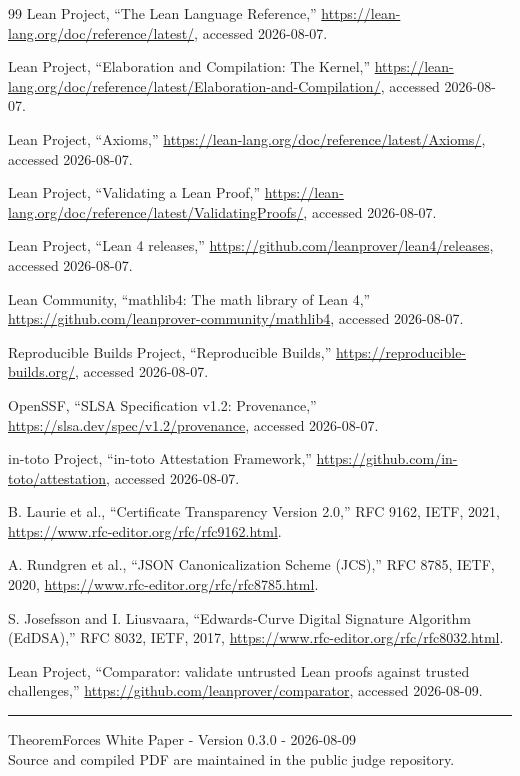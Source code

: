 \documentclass[a4paper,11pt]{ltjsarticle}
\begin{document}
\begin{thebibliography}{99}
Lean Project,
``The Lean Language Reference,''
\url{https://lean-lang.org/doc/reference/latest/}, accessed 2026-08-07.

Lean Project,
``Elaboration and Compilation: The Kernel,''
\url{https://lean-lang.org/doc/reference/latest/Elaboration-and-Compilation/}, accessed 2026-08-07.

Lean Project,
``Axioms,''
\url{https://lean-lang.org/doc/reference/latest/Axioms/}, accessed 2026-08-07.

Lean Project,
``Validating a Lean Proof,''
\url{https://lean-lang.org/doc/reference/latest/ValidatingProofs/}, accessed 2026-08-07.

Lean Project,
``Lean 4 releases,''
\url{https://github.com/leanprover/lean4/releases}, accessed 2026-08-07.

Lean Community,
``mathlib4: The math library of Lean 4,''
\url{https://github.com/leanprover-community/mathlib4}, accessed 2026-08-07.

Reproducible Builds Project,
``Reproducible Builds,''
\url{https://reproducible-builds.org/}, accessed 2026-08-07.

OpenSSF,
``SLSA Specification v1.2: Provenance,''
\url{https://slsa.dev/spec/v1.2/provenance}, accessed 2026-08-07.

in-toto Project,
``in-toto Attestation Framework,''
\url{https://github.com/in-toto/attestation}, accessed 2026-08-07.

B. Laurie et al.,
``Certificate Transparency Version 2.0,'' RFC 9162, IETF, 2021,
\url{https://www.rfc-editor.org/rfc/rfc9162.html}.

A. Rundgren et al.,
``JSON Canonicalization Scheme (JCS),'' RFC 8785, IETF, 2020,
\url{https://www.rfc-editor.org/rfc/rfc8785.html}.

S. Josefsson and I. Liusvaara,
``Edwards-Curve Digital Signature Algorithm (EdDSA),'' RFC 8032, IETF, 2017,
\url{https://www.rfc-editor.org/rfc/rfc8032.html}.

Lean Project,
``Comparator: validate untrusted Lean proofs against trusted challenges,''
\url{https://github.com/leanprover/comparator}, accessed 2026-08-09.
\end{thebibliography}

\vfill
\begin{center}
\color{TFLine}\rule{0.55\textwidth}{0.5pt}

\small\sffamily\color{TFMuted}
TheoremForces White Paper - Version 0.3.0 - 2026-08-09\\
Source and compiled PDF are maintained in the public judge repository.
\end{center}
\end{document}
